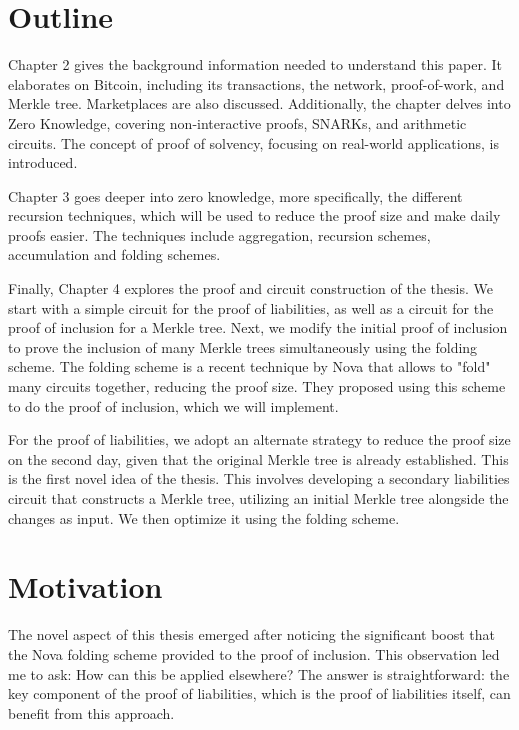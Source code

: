 \section{Outline}

Chapter 2 gives the background information needed to understand this paper.
It elaborates on Bitcoin, including its transactions, the network, proof-of-work, and Merkle tree. Marketplaces are also discussed. 
Additionally, the chapter delves into Zero Knowledge, covering non-interactive proofs, SNARKs, and arithmetic circuits.
The concept of proof of solvency, focusing on real-world applications, is introduced. 

Chapter 3 goes deeper into zero knowledge, more specifically, the different recursion techniques, which will be used to reduce the proof size and make 
daily proofs easier.
The techniques include aggregation, recursion schemes, accumulation and folding schemes.

Finally, Chapter 4 explores the proof and circuit construction of the thesis.
We start with a simple circuit for the proof of liabilities, as well as a circuit for the proof of inclusion for a Merkle tree.
Next, we modify the initial proof of inclusion to prove the inclusion of many Merkle trees simultaneously using the folding scheme.
The folding scheme is a recent technique by Nova that allows to "fold" many circuits together, reducing the proof size. 
They proposed using this scheme to do the proof of inclusion, which we will implement.

For the proof of liabilities, we adopt an alternate strategy to reduce the proof size on the second day, 
given that the original Merkle tree is already established. This is the first novel idea of the thesis.
This involves developing a secondary liabilities circuit that constructs a Merkle tree, utilizing an initial Merkle tree alongside the changes as input.
We then optimize it using the folding scheme.


\section{Motivation}
The novel aspect of this thesis emerged after noticing the significant boost that the Nova folding scheme provided
to the proof of inclusion. This observation led me to ask: How can this be applied elsewhere? The answer is straightforward: the key component of the proof of liabilities, 
which is the proof of liabilities itself, can benefit from this approach.

